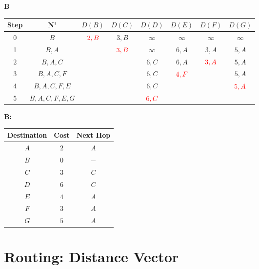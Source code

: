 \documentclass[10pt]{article}
\begin{document}
	\begin{center}
	\textbf{B}
 		\begin{tabular}{||c c c c c c c c||} 
 			\hline
 			Step & N' & $D(B)$ & $D(C)$ & $D(D)$ & $D(E)$ & $D(F)$ & $D(G)$ \\[0.5ex] 
 			\hline\hline
 			0 & $B$ & $\color{red} 2,B$ & $3,B$ & $\infty$ & $\infty$ &$\infty$ & $\infty$ \\
 			\hline
 			1 & $B,A$ & & $\color{red} 3,B$ & $\infty$ & $6,A$ & $3,A$ & $5,A$\\
 			\hline
 			2 & $B,A,C$ & & & $6,C$ & $6,A$ & $\color{red} 3,A$ & $5,A$ \\
 			\hline
 			3 & $B,A,C,F$ & & & $6,C$ & $\color{red} 4,F$ & & $5,A$ \\
 			\hline
 			4 & $B,A,C,F,E$ & & & $6,C$ & & & $\color{red} 5,A$ \\
 			\hline
 			5 & $B,A,C,F,E,G$ & & & $\color{red} 6,C$ & & & \\[0.5ex] 
 			\hline
		\end{tabular}
	\end{center}
	\begin{center}
	\textbf{B:}
		\begin{tabular}{||c || c || c||}
			\hline
 			Destination & Cost & Next Hop\\[0.5ex] 
 			\hline\hline
			$A$ & $2$ & $A$\\
			$B$ & $0$ & $-$\\
 			$C$ & $3$ & $C$\\
			$D$ & $6$ & $C$\\
			$E$ & $4$ & $A$\\
			$F$ & $3$ & $A$\\
			$G$ & $5$ & $A$\\[0.5ex] 
			\hline
		\end{tabular}
	\end{center}	
	
\newpage
\section{Routing: Distance Vector}
\end{document}
